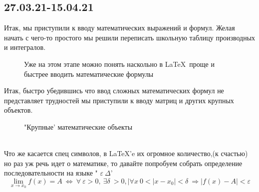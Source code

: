 \documentclass[14pt, a4paper]{extarticle}
\begin{document}
\subsection{27.03.21-15.04.21}
Итак, мы приступили к вводу математических выражений и формул. Желая начать с чего-то простого мы решили переписать школьную таблицу производных и интегралов.
\begin{figure}[h!]
\setlength{\fboxsep}{0pt}%
\setlength{\fboxrule}{1pt}%
%
\caption{Уже на этом этапе можно понять наскольно в \LaTeX \  проще и быстрее вводить математические формулы}
\label{fig:image}
\end{figure}
\newpage
Итак, быстро убедившись что ввод сложных математических формул не представляет трудностей мы приступили к вводу матриц и других крупных объектов.
\begin{figure}[h!]
\setlength{\fboxsep}{0pt}%
\setlength{\fboxrule}{1pt}%
%
\caption{"Крупные' математические объекты}
\end{figure}
\\
Что же касается спец символов, в \LaTeX 'e их огромное количество,(к счастью) но раз уж речь идет о математике, то давайте попробуем собрать определение последовательности на языке " $\varepsilon \ \Delta $'
$$\lim_{x \rightarrow x_0}f(x) = A \  \Leftrightarrow \   \forall \ \varepsilon > 0, \ \exists \delta \ >0, |\forall x \ 0<|x-x_0|<\delta \ \Rightarrow |f(x) - A|< \varepsilon   $$
\end{document}
